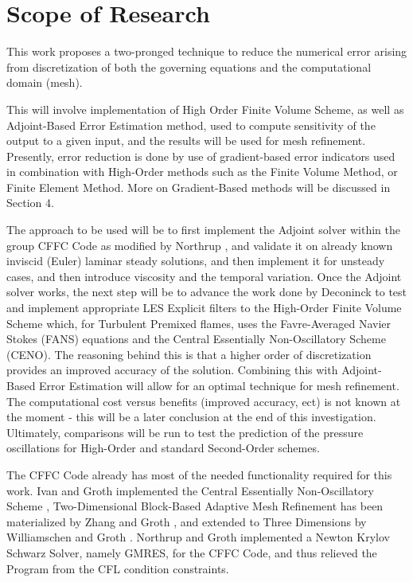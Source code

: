\section{Scope of Research}
This work proposes a two-pronged technique to reduce the numerical error arising from discretization of both the governing equations and the computational domain (mesh).\par

This will involve implementation of High Order Finite Volume Scheme, as well as Adjoint-Based Error Estimation method, used to compute sensitivity of the output to a given input, and the results will be used for mesh refinement. Presently, error reduction is done by use of gradient-based error indicators used in combination with High-Order methods such as the Finite Volume Method, or Finite Element Method. More on Gradient-Based methods will be discussed in Section 4. \par

The approach to be used will be to first implement the Adjoint solver within the group CFFC Code as modified by Northrup \cite{Northrup:2013}, and validate it on already known inviscid (Euler) laminar steady solutions, and then implement it for unsteady cases, and then introduce viscosity and the temporal variation. Once the Adjoint solver works, the next step will be to advance the work done by Deconinck to test and implement appropriate LES Explicit filters \cite{Deconinck:2008} to the High-Order Finite Volume Scheme which, for Turbulent Premixed flames, uses the Favre-Averaged Navier Stokes (FANS) equations and the Central Essentially Non-Oscillatory Scheme (CENO). The reasoning behind this is that a higher order of discretization provides an improved accuracy of the solution. Combining this with Adjoint-Based Error Estimation will allow for an optimal technique for mesh refinement. The computational cost versus benefits (improved accuracy, ect) is not known at the moment - this will be a later conclusion at the end of this investigation. Ultimately, comparisons will be run to test the prediction of the pressure oscillations for High-Order and standard Second-Order schemes.\par

The CFFC Code already has most of the needed functionality required for this work. Ivan and Groth implemented the Central Essentially Non-Oscillatory Scheme \cite{ivan:2007b}, Two-Dimensional Block-Based Adaptive Mesh Refinement has been materialized by Zhang and Groth \cite{Zhang:2011a}, and extended to Three Dimensions by Williamschen and Groth \cite{Williamschen:2013}. Northrup and Groth \cite{Northrup:2013} implemented a Newton Krylov Schwarz Solver, namely GMRES, for the CFFC Code, and thus relieved the Program from the CFL condition constraints.\par

